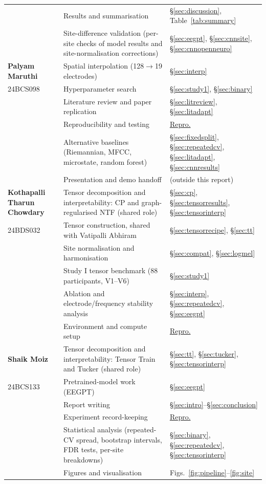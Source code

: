 \documentclass[10pt,twocolumn,a4paper]{article}
\newcommand{\sref}[1]{\S\ref{#1}}
\newcommand{\reprolink}{\hyperref[sec:repro]{Repro.}}
\begin{document}
\begin{table}[!t]
\begin{tabular}{@{}p{}p{}p{}@{}}
 & Results and summarisation & \sref{sec:discussion}, Table~\ref{tab:summary}\\
 & Site-difference validation (per-site checks of model results and site-normalisation corrections) & \sref{sec:eegpt}, \sref{sec:cnnsite}, \sref{sec:cnnopenneuro}\\
\midrule
\textbf{Palyam Maruthi} & Spatial interpolation (128$\to$19 electrodes) & \sref{sec:interp}\\
24BCS098 & Hyperparameter search & \sref{sec:study1}, \sref{sec:binary}\\
 & Literature review and paper replication & \sref{sec:litreview}, \sref{sec:litadapt}\\
 & Reproducibility and testing & \reprolink\\
 & Alternative baselines (Riemannian, MFCC, microstate, random forest) & \sref{sec:fixedsplit}, \sref{sec:repeatedcv}, \sref{sec:litadapt}, \sref{sec:cnnresults}\\
 & Presentation and demo handoff & (outside this report)\\
\midrule
\textbf{Kothapalli Tharun Chowdary} & Tensor decomposition and interpretability: CP and graph-regularised NTF (shared role) & \sref{sec:cp}, \sref{sec:tensorresults}, \sref{sec:tensorinterp}\\
24BDS032 & Tensor construction, shared with Vatipalli Abhiram & \sref{sec:tensorrecipe}, \sref{sec:tt}\\
 & Site normalisation and harmonisation & \sref{sec:compat}, \sref{sec:logmel}\\
 & Study I tensor benchmark (88 participants, V1--V6) & \sref{sec:study1}\\
 & Ablation and electrode/frequency stability analysis & \sref{sec:interp}, \sref{sec:repeatedcv}, \sref{sec:eegpt}\\
 & Environment and compute setup & \reprolink\\
\midrule
\textbf{Shaik Moiz} & Tensor decomposition and interpretability: Tensor Train and Tucker (shared role) & \sref{sec:tt}, \sref{sec:tucker}, \sref{sec:tensorinterp}\\
24BCS133 & Pretrained-model work (EEGPT) & \sref{sec:eegpt}\\
 & Report writing & \sref{sec:intro}--\sref{sec:conclusion}\\
 & Experiment record-keeping & \reprolink\\
 & Statistical analysis (repeated-CV spread, bootstrap intervals, FDR tests, per-site breakdowns) & \sref{sec:binary}, \sref{sec:repeatedcv}, \sref{sec:tensorinterp}\\
 & Figures and visualisation & Figs.~\ref{fig:pipeline}--\ref{fig:site}\\
\bottomrule
\end{tabular}
\end{table}
\end{document}
